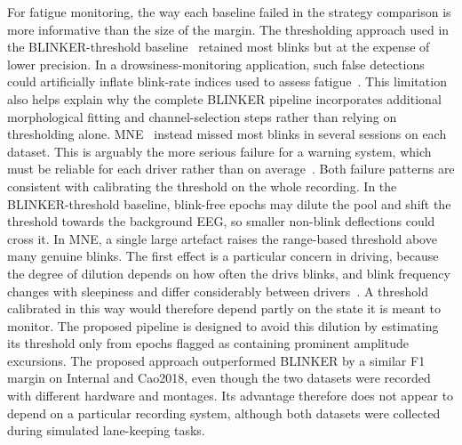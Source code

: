 For fatigue monitoring, the way each baseline failed in the strategy comparison is more informative than the size of the margin.
The thresholding approach used in the BLINKER-threshold baseline~\citep{kleifges2017blinker} retained most blinks but at the expense of lower precision. In a drowsiness-monitoring application, such false detections could artificially inflate blink-rate indices used to assess fatigue~\citep{tian2021fatigue}.
This limitation also helps explain why the complete BLINKER pipeline incorporates additional morphological fitting and channel-selection steps rather than relying on thresholding alone.
MNE~\citep{GramfortEtAl2013a} instead missed most blinks in several sessions on each dataset. This is arguably the more serious failure for a warning system, which must be reliable for each driver rather than on average~\citep{ingre2006subjective}.
%
Both failure patterns are consistent with calibrating the threshold on the whole recording.
In the BLINKER-threshold baseline, blink-free epochs may dilute the pool and shift the threshold towards the background EEG, so smaller non-blink deflections could cross it.
In MNE, a single large artefact raises the range-based threshold above many genuine blinks.
The first effect is a particular concern in driving, because the degree of dilution depends on how often the drivs blinks, and blink frequency changes with sleepiness and differ considerably between drivers~\citep{schleicher2008blinks}.
A threshold calibrated in this way would therefore depend partly on the state it is meant to monitor.
The proposed pipeline is designed to avoid this dilution by estimating its threshold only from epochs flagged as containing prominent amplitude excursions.
The proposed approach outperformed BLINKER by a similar F1 margin on Internal and Cao2018, even though the two datasets were recorded with different hardware and montages.
Its advantage therefore does not appear to depend on a particular recording system, although both datasets were collected during simulated lane-keeping tasks.